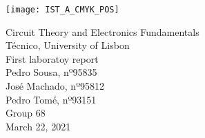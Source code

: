 \thispagestyle {empty}


\texttt{[image: IST\_A\_CMYK\_POS]}

\begin{center}

\vspace{1.0cm}

\vspace{1cm}
{\FontLb Circuit Theory and Electronics Fundamentals} \\ %
\vspace{0.5cm}
{\FontSn Técnico, University of Lisbon} \\ %
\vspace{0.5cm}
{\FontSn First laboratoy report} \\
\vspace{0.5cm}
{\FontSn Pedro Sousa, nº95835} \\
{\FontSn José Machado, nº95812} \\
{\FontSn Pedro Tomé, nº93151} \\
{\FontSn Group 68} \\


{\FontSn March 22, 2021} \\
\end{center}

